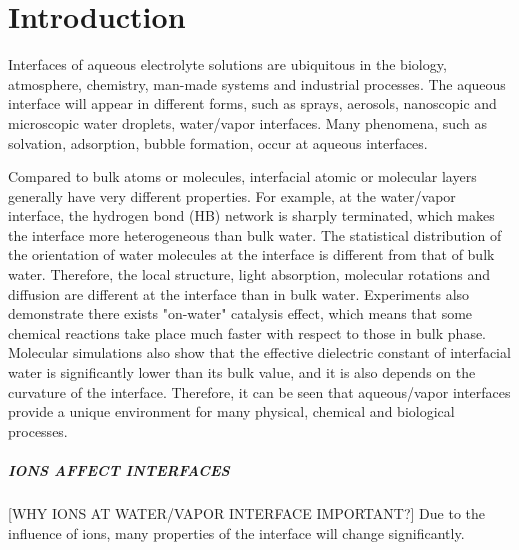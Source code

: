 \chapter{Introduction}\label{CHAPTER_1}
Interfaces of aqueous electrolyte solutions are ubiquitous in the biology, atmosphere, chemistry, man-made systems 
and industrial processes\cite{Irwin88,Tobias99, Benderskii00, 
Asahi01,Benderskii02,Richmond02,LiuH04,
TianCS08,Yamamoto2008, Salmeron2009,ZhangLY09,
LoNostro2012,Piatkowski2014,Balajka2018}.
The aqueous interface will appear in different forms, such as sprays, aerosols, nanoscopic and  microscopic water droplets, water/vapor interfaces.
Many phenomena, such as solvation\cite{Benjamin1996}, adsorption\cite{Chang06}, bubble formation\cite{Craig1993,Craig1993b,Weissenborn1995,Marcelja04,Craig04},
occur at aqueous interfaces\cite{Ball2008,Kuo2004b}. 

Compared to bulk atoms or molecules, interfacial atomic or molecular layers generally have very different properties. 
For example, at the water/vapor interface, the hydrogen bond (HB) network is sharply terminated, which makes the interface more heterogeneous 
than bulk water\cite{singh2013}. 
The statistical distribution of the orientation of water molecules at the interface is different from that of bulk water.
Therefore, the local structure, light absorption,  molecular rotations and diffusion are different at the interface than in bulk water\cite{Jedlovszky2004}.
Experiments also demonstrate there exists "on-water" catalysis effect, which means that some chemical reactions take place much faster 
with respect to those in bulk phase\cite{Rideout1980,Narayan2005,Beattie2010}.
Molecular simulations also show that the effective dielectric constant of interfacial water is significantly lower than its bulk value, 
and it is also depends on the curvature of the interface\cite{Dinpajooh2016}. 
Therefore, it can be seen that aqueous/vapor interfaces provide a unique environment for many physical, chemical and biological processes. 

\paragraph{IONS AFFECT INTERFACES}
[WHY IONS AT WATER/VAPOR INTERFACE IMPORTANT?]
Due to the influence of ions, many properties of the interface will change significantly.

